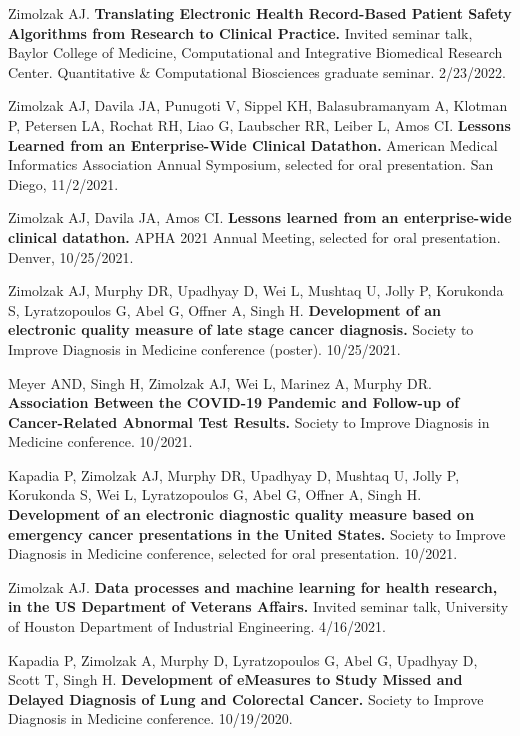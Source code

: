 \documentclass[10pt]{article}
\begin{document}

Zimolzak AJ. \textbf{Translating Electronic Health Record-Based
  Patient Safety Algorithms from Research to Clinical Practice.}
Invited seminar talk, Baylor College of Medicine, Computational and
Integrative Biomedical Research Center. Quantitative \& Computational
Biosciences graduate seminar. 2/23/2022.


Zimolzak AJ, Davila JA, Punugoti V, Sippel KH, Balasubramanyam A,
Klotman P, Petersen LA, Rochat RH, Liao G, Laubscher RR, Leiber L,
Amos CI. \textbf{Lessons Learned from an Enterprise-Wide Clinical
  Datathon.} American Medical Informatics Association Annual
Symposium, selected for oral presentation. San Diego, 11/2/2021.

Zimolzak AJ, Davila JA, Amos CI. \textbf{Lessons learned from an
  enterprise-wide clinical datathon.} APHA 2021 Annual Meeting,
selected for oral presentation. Denver, 10/25/2021.


Zimolzak AJ, Murphy DR, Upadhyay D, Wei L, Mushtaq U, Jolly P,
Korukonda S, Lyratzopoulos G, Abel G, Offner A, Singh H.
\textbf{Development of an electronic quality measure of late stage
  cancer diagnosis.} Society to Improve Diagnosis in Medicine
conference (poster). 10/25/2021.

Meyer AND, Singh H, Zimolzak AJ, Wei L, Marinez A, Murphy DR.
\textbf{Association Between the COVID-19 Pandemic and Follow-up of
  Cancer-Related Abnormal Test Results.} Society to Improve Diagnosis
in Medicine conference. 10/2021.

Kapadia P, Zimolzak AJ, Murphy DR, Upadhyay D, Mushtaq U, Jolly P,
Korukonda S, Wei L, Lyratzopoulos G, Abel G, Offner A, Singh H.
\textbf{Development of an electronic diagnostic quality measure based
  on emergency cancer presentations in the United States.} Society to
Improve Diagnosis in Medicine conference, selected for oral
presentation. 10/2021.

Zimolzak AJ. \textbf{Data processes and machine learning for health
  research, in the US Department of Veterans Affairs.} Invited seminar
talk, University of Houston Department of Industrial Engineering.
4/16/2021.


Kapadia P, Zimolzak A, Murphy D, Lyratzopoulos G, Abel G, Upadhyay D,
Scott T, Singh H. \textbf{Development of eMeasures to Study Missed and
  Delayed Diagnosis of Lung and Colorectal Cancer.} Society to Improve
Diagnosis in Medicine conference. 10/19/2020.
\end{document}

